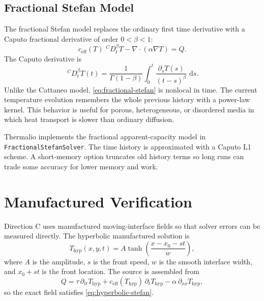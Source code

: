 \documentclass[11pt]{article}
\numberwithin{equation}{section}
\newcommand{\dd}{\,\mathrm{d}}
\newcommand{\DtCaputo}[2]{\,{}^{C}D_{t}^{#1} #2}
\begin{document}
\subsection{Fractional Stefan Model}

The fractional Stefan model replaces the ordinary first time derivative with a
Caputo fractional derivative of order $0<\beta<1$:
\begin{equation}
  c_{\mathrm{eff}}(T)\,\DtCaputo{\beta}{T}
  - \nabla\cdot(\alpha\nabla T) = Q.
  \label{eq:fractional-stefan}
\end{equation}
The Caputo derivative is
\begin{equation}
  \DtCaputo{\beta}{T}(t)
  =
  \frac{1}{\Gamma(1-\beta)}
  \int_0^t \frac{\partial_s T(s)}{(t-s)^\beta}\,\dd s.
  \label{eq:caputo}
\end{equation}
Unlike the Cattaneo model, \eqref{eq:fractional-stefan} is nonlocal in time.
The current temperature evolution remembers the whole previous history with a
power-law kernel.  This behavior is useful for porous, heterogeneous, or
disordered media in which heat transport is slower than ordinary diffusion.

Thermalio implements the fractional apparent-capacity model in
\texttt{FractionalStefanSolver}.  The time history is approximated with a
Caputo L1 scheme.  A short-memory option truncates old history terms so long
runs can trade some accuracy for lower memory and work.

\section{Manufactured Verification}

Direction C uses manufactured moving-interface fields so that solver errors can
be measured directly.  The hyperbolic manufactured solution is
\begin{equation}
  T_{\mathrm{hyp}}(x,y,t)
  =
  A\tanh\left(\frac{x-x_0-s t}{w}\right),
  \label{eq:hyperbolic-manufactured}
\end{equation}
where $A$ is the amplitude, $s$ is the front speed, $w$ is the smooth interface
width, and $x_0+s t$ is the front location.  The source is assembled from
\begin{equation}
  Q =
  \tau\,\partial_{tt}T_{\mathrm{hyp}}
  + c_{\mathrm{eff}}(T_{\mathrm{hyp}})\,\partial_t T_{\mathrm{hyp}}
  - \alpha\,\partial_{xx}T_{\mathrm{hyp}},
  \label{eq:hyperbolic-source}
\end{equation}
so the exact field satisfies \eqref{eq:hyperbolic-stefan}.
\end{document}
